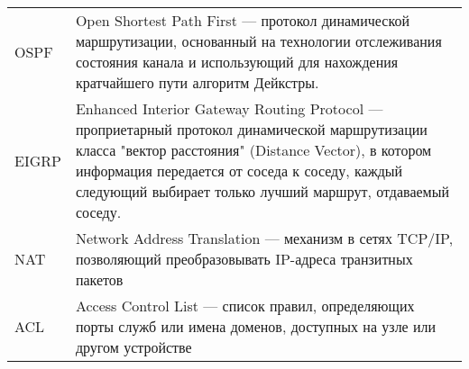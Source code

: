 \makeatletter
\setlength{\@fptop}{0pt}
\makeatother

\begin{table*}[ht!]
	\begin{tabular}{p{}p{}}
		
		OSPF & Open Shortest Path First --- протокол динамической маршрутизации, основанный на технологии отслеживания состояния канала и использующий для нахождения кратчайшего пути алгоритм Дейкстры.\\
		
		
		EIGRP & Enhanced Interior Gateway Routing Protocol --- проприетарный протокол динамической маршрутизации класса "вектор расстояния" (Distance Vector), в котором информация передается от соседа к соседу, каждый следующий выбирает только лучший маршрут, отдаваемый соседу.\\	
		
		NAT &  Network Address Translation --- механизм в сетях TCP/IP, позволяющий преобразовывать IP-адреса транзитных пакетов\\
		
		ACL & Access Control List --- список правил, определяющих порты служб или имена доменов, доступных на узле или другом устройстве\\
		
		
		
			
	\end{tabular}	
\end{table*}
		
